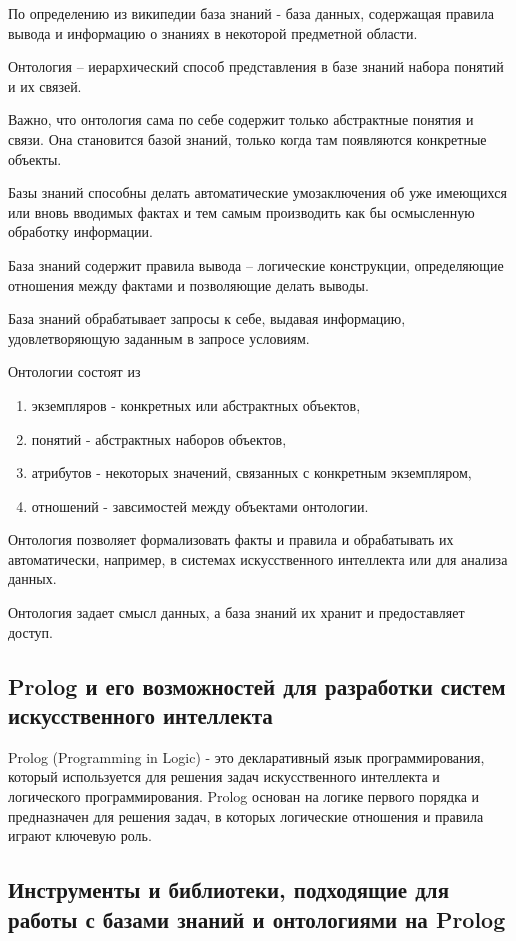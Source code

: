 \documentclass{article}
\begin{document}
По определению из википедии база знаний - база данных, содержащая
правила вывода и информацию о знаниях в некоторой предметной
области.

Онтология -- иерархический способ представления в базе знаний
набора понятий и их связей.

Важно, что онтология сама по себе содержит только абстрактные
понятия и связи. Она становится базой знаний, только когда там
появляются конкретные объекты.

Базы знаний способны делать автоматические умозаключения об уже
имеющихся или вновь вводимых фактах и тем самым производить
как бы осмысленную обработку информации.

База знаний содержит правила вывода -- логические конструкции,
определяющие отношения между фактами и позволяющие делать выводы.

База знаний обрабатывает запросы к себе, выдавая информацию,
удовлетворяющую заданным в запросе условиям.

Онтологии состоят из
\begin{enumerate}
  \item экземпляров - конкретных или абстрактных объектов,
  \item понятий - абстрактных наборов объектов,
  \item атрибутов - некоторых значений, связанных с конкретным экземпляром,
  \item отношений - завсимостей между объектами онтологии.
\end{enumerate}

Онтология позволяет формализовать факты и правила и обрабатывать их
автоматически, например, в системах искусственного интеллекта или
для анализа данных.

Онтология задает смысл данных, а база знаний их хранит и предоставляет
доступ.

\subsection{Prolog и его возможностей для разработки систем искусственного интеллекта}

Prolog (Programming in Logic) - это декларативный язык
программирования, который используется для решения задач
искусственного интеллекта и логического программирования.
Prolog основан на логике первого порядка и предназначен для
решения задач, в которых логические отношения и правила
играют ключевую роль.

\subsection{Инструменты и библиотеки, подходящие для работы с базами знаний и онтологиями на Prolog}
\end{document}
